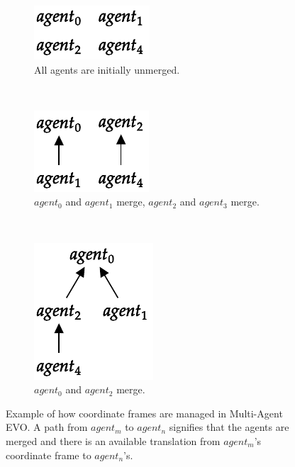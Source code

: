 \begin{figure}[h]
    \centering
    \begin{subfigure}[t]{0.3\textwidth}
        \centering
        \includegraphics[width=0.5\linewidth]{figures/evo_1.pdf}
        \caption{All agents are initially unmerged.}
    \end{subfigure}%
    ~
    \begin{subfigure}[t]{0.3\textwidth}
        \centering
        \includegraphics[width=0.5\linewidth]{figures/evo_2.pdf}
        \caption{$agent_0$ and $agent_1$ merge, $agent_2$ and $agent_3$ merge.}
    \end{subfigure}%
    ~
    \begin{subfigure}[t]{0.3\textwidth}
        \centering
        \includegraphics[width=0.5\linewidth]{figures/evo_3.pdf}
        \caption{$agent_0$ and $agent_2$ merge.}
    \end{subfigure}%

    \caption{Example of how coordinate frames are managed in Multi-Agent EVO. A path from $agent_m$ to $agent_n$ signifies that the agents are merged and there is an available translation from $agent_m$'s coordinate frame to $agent_n$'s.}
    \label{fig:evo-coord-frames}
\end{figure}


